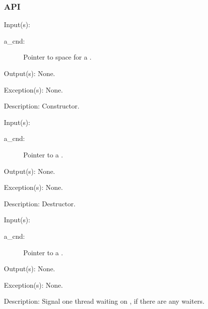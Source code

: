 \subsubsection{API}
\begin{capi}
\label{cnd_new}
	\begin{capilist}
	\item[Input(s): ]
		\begin{description}\item[]
		\item[a\_cnd: ]
			Pointer to space for a .
		\end{description}
	\item[Output(s): ] None.
	\item[Exception(s): ] None.
	\item[Description: ]
		Constructor.
	\end{capilist}
\label{cnd_delete}
	\begin{capilist}
	\item[Input(s): ]
		\begin{description}\item[]
		\item[a\_cnd: ]
			Pointer to a \classname{cnd}.
		\end{description}
	\item[Output(s): ] None.
	\item[Exception(s): ] None.
	\item[Description: ]
		Destructor.
	\end{capilist}
\label{cnd_signal}
	\begin{capilist}
	\item[Input(s): ]
		\begin{description}\item[]
		\item[a\_cnd: ]
			Pointer to a .
		\end{description}
	\item[Output(s): ] None.
	\item[Exception(s): ] None.
	\item[Description: ]
		Signal one thread waiting on , if there are any
		waiters.
	\end{capilist}
\label{cnd_broadcast}

\end{capi}
